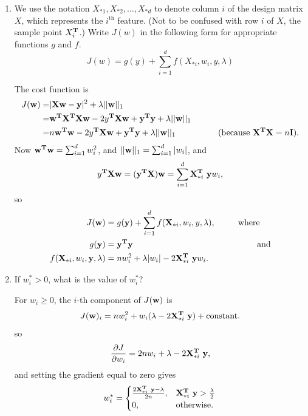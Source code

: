 \begin{enumerate}
\item
We use the notation $X_{*1}, X_{*2}, \ldots, X_{*d}$ to denote column $i$ of the design matrix $X$, which represents the $i^\mathrm{th}$ feature.
(Not to be confused with row $i$ of $X$, the sample point $X_i^{\mathbf{T}}$.)
Write $J(w)$ in the following form for appropriate functions $g$ and $f$.
\[
J(w) = g(y) + \sum_{i=1}^d f(X_{*i}, w_i, y, \lambda)
\]

\begin{mdframed}
  The cost function is
  \begin{align*}
    J(\mathbf{w})
    =& |\mathbf{X}\mathbf{w} - \mathbf{y}|^2 + \lambda ||\mathbf{w}||_1 \\
    =& \mathbf{w}^{\mathbf{T}}\mathbf{X}^{\mathbf{T}}\mathbf{X}\mathbf{w} - 2y^{\mathbf{T}}\mathbf{X}\mathbf{w} + \mathbf{y}^{\mathbf{T}}\mathbf{y} + \lambda ||\mathbf{w}||_1 \\
    =& n\mathbf{w}^{\mathbf{T}}\mathbf{w} - 2y^{\mathbf{T}}\mathbf{X}\mathbf{w} + \mathbf{y}^{\mathbf{T}}\mathbf{y} + \lambda ||\mathbf{w}||_1 ~~~~~~~~~~~~~~~\text{(because $\mathbf{X}^{\mathbf{T}}\mathbf{X}=n\mathbf{I}$)}.\\
  \end{align*}
Now $\mathbf{w}^{\mathbf{T}}\mathbf{w} = \sum_{i=1}^d w_i^2$, and $||\mathbf{w}||_1 = \sum_{i=1}^d |w_i|$, and
\begin{align*}
  y^{\mathbf{T}}\mathbf{X}\mathbf{w} &= (\mathbf{y}^{\mathbf{T}}\mathbf{X}) \mathbf{w} = \sum_{i=1}^d \mathbf{X}_{*i}^{\mathbf{T}} ~\mathbf{y} w_i, \\
\end{align*}
so
\begin{align*}
  J(\mathbf{w}) &= g(\mathbf{y}) + \sum_{i=1}^d f(\mathbf{X}_{*i}, w_i, y, \lambda), ~~~~~~~~\text{where}\\
  g(\mathbf{y}) &= \mathbf{y}^{\mathbf{T}}\mathbf{y} ~~~~~~~~~~~~~~~~~~~~~~~~~~~~~~~~~~~~~~~~~~~~\text{and}\\
  f(\mathbf{X}_{*i}, w_i, \mathbf{y}, \lambda) &= nw_i^2 + \lambda|w_i| - 2\mathbf{X}_{*i}^{\mathbf{T}} ~\mathbf{y} w_i.
\end{align*}
\end{mdframed}

\item
If $w_i^* > 0$, what is the value of $w_i^*$?

\begin{mdframed}
For $w_i \geq 0$, the $i$-th component of $J(\mathbf{w})$ is
\begin{align*}
  J(\mathbf{w})_i = nw_i^2 + w_i (\lambda  - 2\mathbf{X}_{*i}^{\mathbf{T}} ~\mathbf{y}) + \text{constant}.
\end{align*}
so
\begin{align*}
  \frac{\partial J}{\partial w_i} = 2nw_i + \lambda - 2\mathbf{X}_{*i}^{\mathbf{T}} ~\mathbf{y},
\end{align*}
and setting the gradient equal to zero gives
\begin{align*}
  w^*_i =
  \begin{cases}
    \frac{ 2\mathbf{X}_{*i}^{\mathbf{T}} ~\mathbf{y} - \lambda }{2n}, &\mathbf{X}_{*i}^{\mathbf{T}} ~\mathbf{y}  > \frac{\lambda}{2}\\
    0,                                     &\text{otherwise}.
  \end{cases}
\end{align*}
\end{mdframed}


\end{enumerate}
